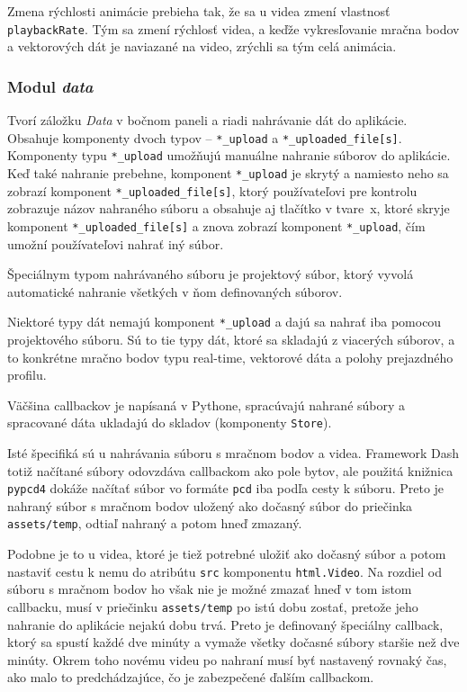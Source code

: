 Zmena rýchlosti animácie prebieha tak, že sa u videa zmení vlastnosť \texttt{playbackRate}. Tým sa zmení rýchlosť videa, a keďže vykresľovanie mračna bodov a vektorových dát je naviazané na video, zrýchli sa tým celá animácia.

\subsubsection{Modul \emph{data} }

Tvorí záložku \emph{Data} v bočnom paneli a riadi nahrávanie dát do aplikácie. Obsahuje komponenty dvoch typov -- \texttt{*\_upload} a \texttt{*\_uploaded\_file[s]}. Komponenty typu \texttt{*\_upload} umožňujú manuálne nahranie súborov do aplikácie. Keď také nahranie prebehne, komponent \texttt{*\_upload} je skrytý a namiesto neho sa zobrazí komponent \texttt{*\_uploaded\_file[s]}, ktorý používateľovi pre kontrolu zobrazuje názov nahraného súboru a obsahuje aj tlačítko v tvare~x, ktoré skryje komponent \texttt{*\_uploaded\_file[s]} a znova zobrazí komponent \texttt{*\_upload}, čím umožní používateľovi nahrať iný súbor.

Špeciálnym typom nahrávaného súboru je projektový súbor, ktorý vyvolá automatické nahranie všetkých v ňom definovaných súborov.

Niektoré typy dát nemajú komponent \texttt{*\_upload} a dajú sa nahrať iba pomocou projektového súboru. Sú to tie typy dát, ktoré sa skladajú z viacerých súborov, a to konkrétne mračno bodov typu real-time, vektorové dáta a polohy prejazdného profilu.

Väčšina callbackov je napísaná v Pythone, spracúvajú nahrané súbory a spracované dáta ukladajú do skladov (komponenty \texttt{Store}).

Isté špecifiká sú u nahrávania súboru s mračnom bodov a videa. Framework Dash totiž načítané súbory odovzdáva callbackom ako pole bytov, ale použitá knižnica \texttt{pypcd4} dokáže načítať súbor vo formáte \texttt{pcd} iba podľa cesty k súboru. Preto je nahraný súbor s mračnom bodov uložený ako dočasný súbor do priečinka \texttt{assets/temp}, odtiaľ nahraný a potom hneď zmazaný.

Podobne je to u videa, ktoré je tiež potrebné uložiť ako dočasný súbor a potom nastaviť cestu k nemu do atribútu \texttt{src} komponentu \texttt{html.Video}. Na rozdiel od súboru s mračnom bodov ho však nie je možné zmazať hneď v tom istom callbacku, musí v priečinku \texttt{assets/temp} po istú dobu zostať, pretože jeho nahranie do aplikácie nejakú dobu trvá. Preto je definovaný špeciálny callback, ktorý sa spustí každé dve minúty a vymaže všetky dočasné súbory staršie než dve minúty. Okrem toho novému videu po nahraní musí byť nastavený rovnaký čas, ako malo to predchádzajúce, čo je zabezpečené ďalším callbackom.

